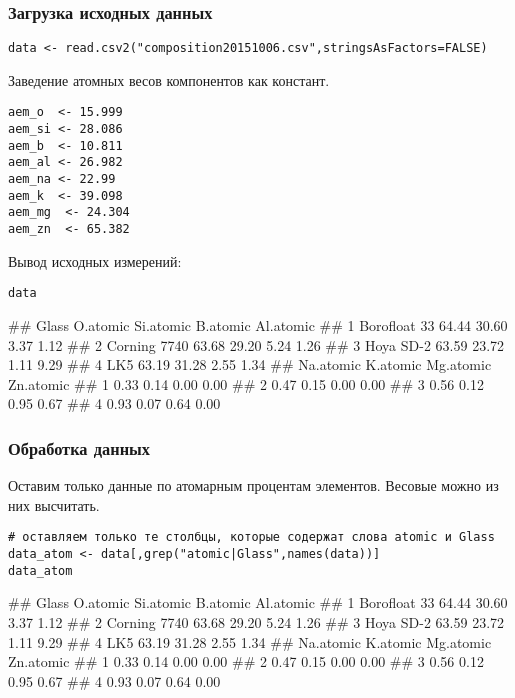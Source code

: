 \subsubsection{Загрузка исходных данных}

\begin{lstlisting}[language=Renhanced]
data <- read.csv2("composition20151006.csv",stringsAsFactors=FALSE)
\end{lstlisting}

Заведение атомных весов компонентов как констант.

\begin{lstlisting}[language=Renhanced]
aem_o  <- 15.999
aem_si <- 28.086
aem_b  <- 10.811
aem_al <- 26.982
aem_na <- 22.99
aem_k  <- 39.098
aem_mg  <- 24.304
aem_zn  <- 65.382
\end{lstlisting}

Вывод исходных измерений:

\begin{lstlisting}[language=Renhanced]
data
\end{lstlisting}

\begin{Verb}
##          Glass O.atomic Si.atomic B.atomic Al.atomic
## 1 Borofloat 33    64.44     30.60     3.37      1.12
## 2 Corning 7740    63.68     29.20     5.24      1.26
## 3    Hoya SD-2    63.59     23.72     1.11      9.29
## 4          LK5    63.19     31.28     2.55      1.34
##   Na.atomic K.atomic Mg.atomic Zn.atomic
## 1      0.33     0.14      0.00      0.00
## 2      0.47     0.15      0.00      0.00
## 3      0.56     0.12      0.95      0.67
## 4      0.93     0.07      0.64      0.00
\end{Verb}

\subsubsection{Обработка данных}

Оставим только данные по атомарным процентам элементов. Весовые можно из
них высчитать.

\begin{lstlisting}[language=Renhanced]
# оставляем только те столбцы, которые содержат слова atomic и Glass
data_atom <- data[,grep("atomic|Glass",names(data))]
data_atom
\end{lstlisting}

\begin{Verb}
##          Glass O.atomic Si.atomic B.atomic Al.atomic
## 1 Borofloat 33    64.44     30.60     3.37      1.12
## 2 Corning 7740    63.68     29.20     5.24      1.26
## 3    Hoya SD-2    63.59     23.72     1.11      9.29
## 4          LK5    63.19     31.28     2.55      1.34
##   Na.atomic K.atomic Mg.atomic Zn.atomic
## 1      0.33     0.14      0.00      0.00
## 2      0.47     0.15      0.00      0.00
## 3      0.56     0.12      0.95      0.67
## 4      0.93     0.07      0.64      0.00
\end{Verb}

